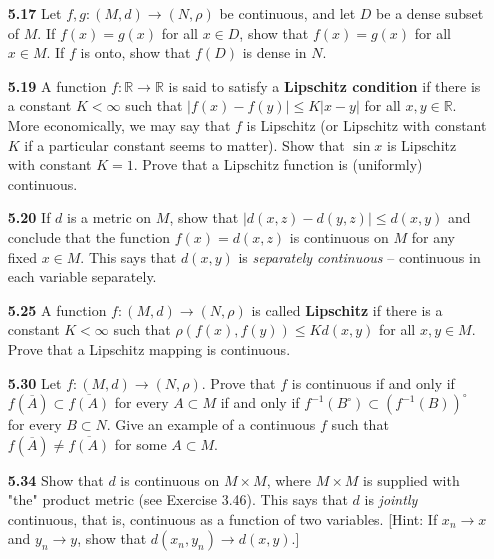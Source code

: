 \documentclass[12pt]{amsart}
\def\iff{if and only if }
\def\RR{{\mathbb R}}
\newcommand{\inv}[1]{#1^{-1}}
\newcommand{\inter}[1]{#1^\circ}
\begin{document}
\begin{enumerate}
\bigskip

\item[\bf 5.17] Let $f, g:(M,d)\to(N,\rho)$ be continuous, and let $D$ be a dense subset of $M$. If $f(x)=g(x)$ for all $x\in D$, show that $f(x)=g(x)$ for all $x\in M$. If $f$ is onto, show that $f(D)$ is dense in $N$.

\bigskip

\item[\bf 5.19] A function $f:\RR\to\RR$ is said to satisfy a {\bf Lipschitz condition} if there is a constant $K<\infty$ such that $|f(x)-f(y)|\leq K|x-y|$ for all $x,y\in\RR$. More economically, we may say that $f$ is Lipschitz (or Lipschitz with constant $K$ if a particular constant seems to matter). Show that $\sin x$ is Lipschitz with constant $K=1$. Prove that a Lipschitz function is (uniformly) continuous. 

\bigskip

\item[\bf 5.20] If $d$ is a metric on $M$, show that $|d(x,z)-d(y,z)|\leq d(x,y)$ and conclude that the function $f(x)=d(x,z)$ is continuous on $M$ for any fixed $x\in M$. This says that $d(x,y)$ is \textit{separately continuous} \--- continuous in each variable separately. 

\bigskip

\item[\bf 5.25] A function $f:(M,d)\to(N,\rho)$ is called {\bf Lipschitz} if there is a constant $K<\infty$ such that $\rho(f(x),f(y))\leq Kd(x,y)$ for all $x,y\in M$. Prove that a Lipschitz mapping is continuous. 

\bigskip

\item[\bf 5.30] Let $f:(M,d)\to(N,\rho)$. Prove that $f$ is continuous \iff $f\left(\overline A\right)\subset\overline{f(A)}$ for every $A \subset M$ \iff $\inv f\left(\inter B\right)\subset \inter{\left( \inv f (B)\right)}$ for every $B\subset N$. Give an example of a continuous $f$ such that $f\left(\overline A\right)\neq \overline{f(A)}$ for some $A\subset M$. 

\bigskip

\item[\bf 5.34] Show that $d$ is continuous on $M\times M$, where $M\times M$ is supplied with "the" product metric (see Exercise 3.46). This says that $d$ is \textit{jointly} continuous, that is, continuous as a function of two variables. [Hint: If $x_n\to x$ and $y_n\to y$, show that $d(x_n,y_n)\to d(x,y).$]

\bigskip


\end{enumerate}
\end{document}
